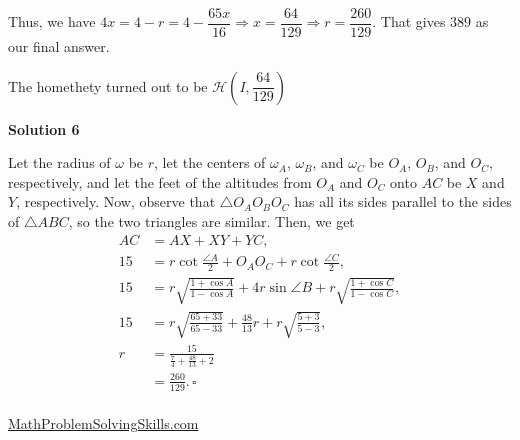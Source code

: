\begin{enumerate}
 Thus, we have $4x = 4-r = 4-\dfrac{65x}{16} \Longrightarrow x = \dfrac{64}{129} \Longrightarrow r = \dfrac{260}{129}$. That gives $\boxed{389}$ as our final answer.

 The homethety turned out to be $\mathcal{H} \left(I, \dfrac{64}{129}\right)$




\textbf{Solution 6}

Let the radius of $\omega$ be $r$, let the centers of $\omega_A$, $\omega_B$, and $\omega_C$ be $O_A$, $O_B$, and $O_C$, respectively, and let the feet of the altitudes from $O_A$ and $O_C$ onto $AC$ be $X$ and $Y$, respectively. Now, observe that $\triangle O_AO_BO_C$ has all its sides parallel to the sides of $\triangle ABC$, so the two triangles are similar. Then, we get\begin{align*}AC&=AX+XY+YC,\\15&=r\cot\frac{\angle A}{2}+O_AO_C+r\cot\frac{\angle C}{2},\\15&=r\sqrt{\frac{1+\cos A}{1-\cos A}}+4r\sin\angle B+r\sqrt{\frac{1+\cos C}{1-\cos C}},\\15&=r\sqrt{\frac{65+33}{65-33}}+\frac{48}{13}r+r\sqrt{\frac{5+3}{5-3}},\\r&=\frac{15}{\frac 74+\frac{48}{13}+2}\\&=\boxed{\frac{260}{129}}.\,\square\\\end{align*}


 


 \href{https://mathproblemsolvingskills.wordpress.com/}{MathProblemSolvingSkills.com}

 


 


\end{enumerate}